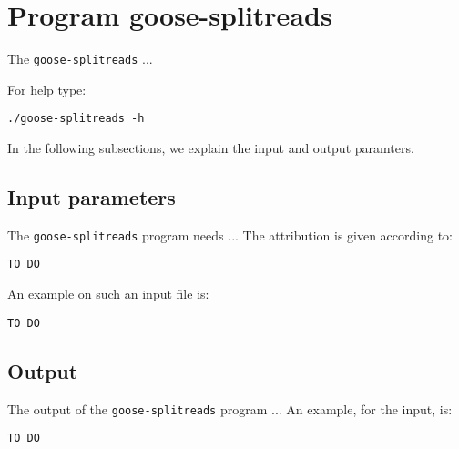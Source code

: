 \section{Program goose-splitreads}
The \texttt{goose-splitreads} ...

For help type:
\begin{lstlisting}
./goose-splitreads -h
\end{lstlisting}
In the following subsections, we explain the input and output paramters.

\subsection*{Input parameters}

The \texttt{goose-splitreads} program needs ...
The attribution is given according to:
\begin{lstlisting}
TO DO
\end{lstlisting}

An example on such an input file is:
\begin{lstlisting}
TO DO
\end{lstlisting}

\subsection*{Output}
The output of the \texttt{goose-splitreads} program ...
An example, for the input, is:
\begin{lstlisting}
TO DO
\end{lstlisting}
